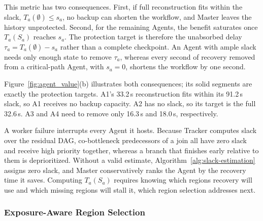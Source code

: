 This metric has two consequences. First, if full reconstruction fits
within the slack, $T_a(\emptyset)\le s_a$, no backup can shorten the
workflow, and Master leaves the history unprotected. Second, for the
remaining Agents, the benefit saturates once $T_a(S_a)$ reaches $s_a$.
The protection target is therefore the unabsorbed delay
$\tau_a=T_a(\emptyset)-s_a$ rather than a complete checkpoint. An Agent
with ample slack needs only enough state to remove $\tau_a$, whereas
every second of recovery removed from a critical-path Agent, with
$s_a=0$, shortens the workflow by one second.

Figure~\ref{fig:agent_value}(b) illustrates both consequences; its solid
segments are exactly the protection targets. A1's 33.2\,s reconstruction
fits within its 91.2\,s slack, so A1 receives no backup capacity. A2 has
no slack, so its target is the full 32.6\,s. A3 and A4 need to remove
only 16.3\,s and 18.0\,s, respectively.

A worker failure interrupts every Agent it hosts. Because Tracker
computes slack over the residual DAG, co-bottleneck predecessors of a
join all have zero slack and receive high priority together, whereas a
branch that finishes early relative to them is deprioritized. Without a
valid estimate, Algorithm~\ref{alg:slack-estimation} assigns zero slack,
and Master conservatively ranks the Agent by the recovery time it saves.
Computing $T_a(S_a)$ requires knowing which regions recovery will use
and which missing regions will stall it, which region selection
addresses next.

\subsubsection{Exposure-Aware Region Selection}
\label{sec:region-selection}


